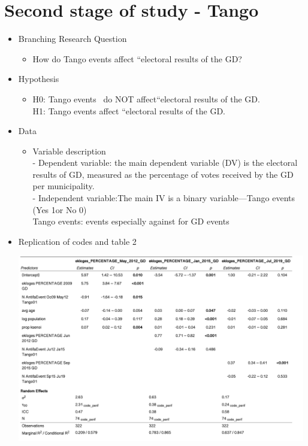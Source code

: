 \documentclass[12pt,letterpaper]{article}
\begin{document}
\section*{Second stage of study - Tango}
\vspace{.25cm}
\begin{itemize}
	\item
	Branching Research Question
	\begin{itemize}
		\item How do Tango events affect “electoral results of the GD?
	\end{itemize}
	\item
	Hypothesis
	\begin{itemize}
		\item H0: Tango events  do NOT affect“electoral results of the GD.\\
		H1: Tango events affect “electoral results of the GD.\\
	\end{itemize}
	\item
	Data
	\begin{itemize}
		\item 
		Variable description\\
		- Dependent variable: the main dependent variable (DV) is the electoral results of GD, measured as the percentage of votes received by the GD per municipality.\\
		- Independent variable:The main IV is a binary variable---Tango events (Yes 1or No 0)\\
		Tango events: events especially against for GD events
	\end{itemize}
	\item 
	Replication of codes and table 2
	\begin{itemize}
		
		\includegraphics[width=0.99\textwidth]{Table_2.png}

\end{itemize}
\end{itemize}
\end{document}
